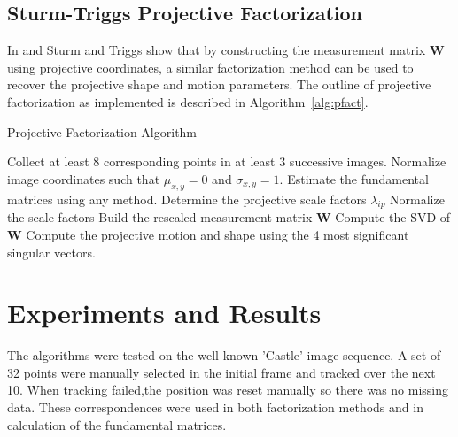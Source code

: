 \documentclass{article}
\begin{document}
\subsection{Sturm-Triggs Projective Factorization}
In \cite{sturm1996} and \cite{triggs1996} Sturm and Triggs show that by constructing 
the measurement matrix $\mathbf{W}$ using projective coordinates, a similar factorization
method can be used to recover the projective shape and motion parameters.  The outline of projective factorization as implemented is described in Algorithm~\ref{alg:pfact}.
\begin{algorithm}[htb]
	\caption{Projective Factorization Algorithm}
	\label{alg:pfact}
	\begin{algorithmic}[1]
		\STATE Collect at least 8 corresponding points in at least 3 successive images.
		\STATE Normalize image coordinates such that $\mu_{x,y}=0$ and $\sigma_{x,y}=1$.
		\STATE Estimate the fundamental matrices using any method.
		\STATE Determine the projective scale factors $\lambda_{ip}$
		\STATE Normalize the scale factors
		\STATE Build the rescaled measurement matrix $\mathbf{W}$
		\STATE Compute the SVD of $\mathbf{W}$
		\STATE Compute the projective motion and shape using the 4 most significant singular vectors.
	\end{algorithmic}
\end{algorithm}


\section{Experiments and Results}
The algorithms were tested on the well known 'Castle' image sequence.  A set of 32 points
were manually selected in the initial frame and tracked over the next 10.  When tracking failed,the position was reset manually so there was no missing data.  These correspondences were used in both factorization methods and in calculation of the fundamental matrices.  
\end{document}
